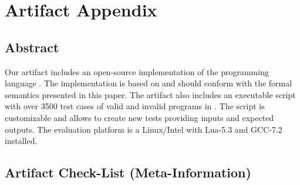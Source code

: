 \section{Artifact Appendix}


\subsection{Abstract}

Our artifact includes an open-source implementation of the programming language
\CEU.
The implementation is based on and should conform with the formal semantics
presented in this paper.
The artifact also includes an executable script with over 3500 test cases of
valid and invalid programs in \CEU.
The script is customizable and allows to create new tests providing inputs and
expected outputs.
The evaluation platform is a Linux/Intel with Lua-5.3 and GCC-7.2 installed.

\subsection{Artifact Check-List (Meta-Information)}

